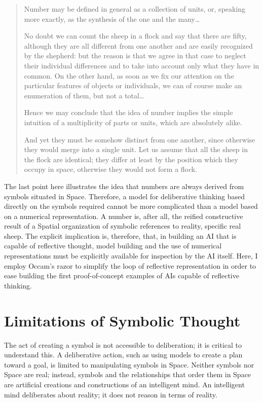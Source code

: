 \begin{quote}
Number may be defined in general as a collection of units, or,
speaking more exactly, as the synthesis of the one and the
many\ldots

No doubt we can count the sheep in a flock and say that there are
fifty, although they are all different from one another and are easily
recognized by the shepherd: but the reason is that we agree in that
case to neglect their individual differences and to take into account
only what they have in common.  On the other hand, as soon as we fix
our attention on the particular features of objects or individuals, we
can of course make an enumeration of them, but not a total\ldots

Hence we may conclude that the idea of number implies the simple
intuition of a multiplicity of parts or units, which are absolutely
alike.

And yet they must be somehow distinct from one another, since
otherwise they would merge into a single unit.  Let us assume that all
the sheep in the flock are identical; they differ at least by the
position which they occupy in space, otherwise they would not form a
flock.
\end{quote}

The last point here illustrates the idea that numbers are always
derived from symbols situated in Space.  Therefore, a model for
deliberative thinking based directly on the symbols required cannot be
more complicated than a model based on a numerical representation.  A
number is, after all, the reified constructive result of a Spatial
organization of symbolic references to reality, specific real sheep.
The explicit implication is, therefore, that, in building an AI that
is capable of reflective thought, model building and the use of
numerical representations must be explicitly available for inspection
by the AI itself.  Here, I employ Occam's razor to simplify the loop
of reflective representation in order to ease building the first
proof-of-concept examples of AIs capable of reflective thinking.

\section{Limitations of Symbolic Thought}

The act of creating a symbol is not accessible to deliberation; it is
critical to understand this.  A deliberative action, such as using
models to create a plan toward a goal, is limited to manipulating
symbols in Space.  Neither symbols nor Space are real; instead,
symbols and the relationships that order them in Space are artificial
creations and constructions of an intelligent mind.  An intelligent
mind deliberates about reality; it does not reason in terms of
reality.

